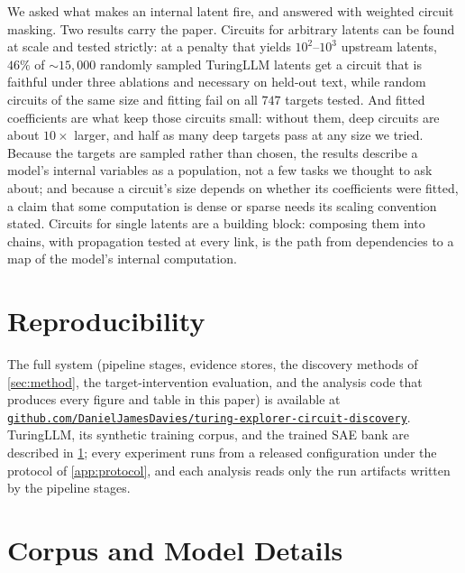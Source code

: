 \documentclass[10pt]{article}
\begin{document}
We asked what makes an internal latent fire, and answered with weighted circuit masking.
Two results carry the paper.
Circuits for arbitrary latents can be found at scale and tested strictly: at a penalty that yields $10^{2}$--$10^{3}$ upstream latents, $46\%$ of ${\sim}15{,}000$ randomly sampled TuringLLM latents get a circuit that is faithful under three ablations and necessary on held-out text, while random circuits of the same size and fitting fail on all $747$ targets tested.
And fitted coefficients are what keep those circuits small: without them, deep circuits are about $10\times$ larger, and half as many deep targets pass at any size we tried.
Because the targets are sampled rather than chosen, the results describe a model's internal variables as a population, not a few tasks we thought to ask about; and because a circuit's size depends on whether its coefficients were fitted, a claim that some computation is dense or sparse needs its scaling convention stated.
Circuits for single latents are a building block: composing them into chains, with propagation tested at every link, is the path from dependencies to a map of the model's internal computation.
\label{end-of-main}

\section*{Reproducibility}
The full system (pipeline stages, evidence stores, the discovery methods of \cref{sec:method}, the target-intervention evaluation, and the analysis code that produces every figure and table in this paper) is available at \href{https://github.com/DanielJamesDavies/turing-explorer-circuit-discovery}{\nolinkurl{github.com/DanielJamesDavies/turing-explorer-circuit-discovery}}.
TuringLLM, its synthetic training corpus, and the trained SAE bank are described in \cref{app:corpus}; every experiment runs from a released configuration under the protocol of \cref{app:protocol}, and each analysis reads only the run artifacts written by the pipeline stages.




\appendix
{}

\section{Corpus and Model Details}
\label{app:corpus}
\end{document}
